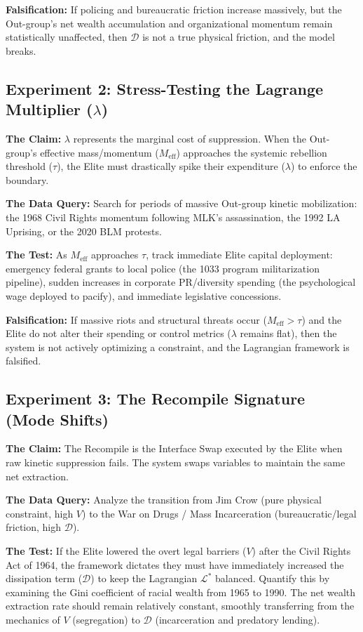 \textbf{Falsification:} If policing and bureaucratic friction increase massively, but the Out-group's net wealth accumulation and organizational momentum remain statistically unaffected, then $\mathcal{D}$ is not a true physical friction, and the model breaks.

\subsection{Experiment 2: Stress-Testing the Lagrange Multiplier ($\lambda$)}

\textbf{The Claim:} $\lambda$ represents the marginal cost of suppression. When the Out-group's effective mass/momentum ($M_{\text{eff}}$) approaches the systemic rebellion threshold ($\tau$), the Elite must drastically spike their expenditure ($\lambda$) to enforce the boundary.

\textbf{The Data Query:} Search for periods of massive Out-group kinetic mobilization: the 1968 Civil Rights momentum following MLK's assassination, the 1992 LA Uprising, or the 2020 BLM protests.

\textbf{The Test:} As $M_{\text{eff}}$ approaches $\tau$, track immediate Elite capital deployment: emergency federal grants to local police (the 1033 program militarization pipeline), sudden increases in corporate PR/diversity spending (the psychological wage deployed to pacify), and immediate legislative concessions.

\textbf{Falsification:} If massive riots and structural threats occur ($M_{\text{eff}} > \tau$) and the Elite do not alter their spending or control metrics ($\lambda$ remains flat), then the system is not actively optimizing a constraint, and the Lagrangian framework is falsified.

\subsection{Experiment 3: The Recompile Signature (Mode Shifts)}

\textbf{The Claim:} The Recompile is the Interface Swap executed by the Elite when raw kinetic suppression fails. The system swaps variables to maintain the same net extraction.

\textbf{The Data Query:} Analyze the transition from Jim Crow (pure physical constraint, high $V$) to the War on Drugs / Mass Incarceration (bureaucratic/legal friction, high $\mathcal{D}$).

\textbf{The Test:} If the Elite lowered the overt legal barriers ($V$) after the Civil Rights Act of 1964, the framework dictates they must have immediately increased the dissipation term ($\mathcal{D}$) to keep the Lagrangian $\mathcal{L}^*$ balanced. Quantify this by examining the Gini coefficient of racial wealth from 1965 to 1990. The net wealth extraction rate should remain relatively constant, smoothly transferring from the mechanics of $V$ (segregation) to $\mathcal{D}$ (incarceration and predatory lending).

